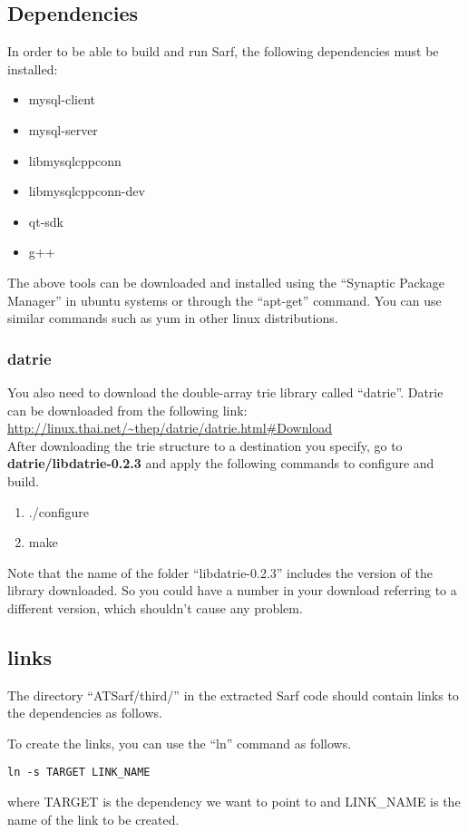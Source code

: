 \documentclass{article}
\begin{document}
\subsection{Dependencies}
In order to be able to build and run Sarf, the following dependencies must be installed:
\begin{itemize}
\item mysql-client
\item mysql-server
\item libmysqlcppconn
\item libmysqlcppconn-dev
\item qt-sdk
\item g++
\end{itemize}
The above tools can be downloaded and installed using the ``Synaptic Package Manager'' in ubuntu systems or through the ``apt-get'' command. You can use similar commands such as yum in other linux distributions.
\subsubsection{datrie}
You also need to download the double-array trie library called ``datrie''. Datrie can be downloaded from the following link:\\
\url{http://linux.thai.net/~thep/datrie/datrie.html#Download }\\
After downloading the trie structure to a destination you specify, go to {\bf datrie/libdatrie-0.2.3} and apply the following commands to configure and build.
\begin{enumerate}
\item ./configure
\item make
\end{enumerate}
Note that the name of the folder ``libdatrie-0.2.3'' includes the version of the library downloaded. So you could have a number in your download referring to a different version, which shouldn't cause any problem.

\subsection{links}
The directory ``ATSarf/third/'' in the extracted Sarf code should contain links to the dependencies as follows.

To create the links, you can use the ``ln'' command as follows.\\
\begin{verbatim}
ln -s TARGET LINK_NAME
\end{verbatim}
where TARGET is the dependency we want to point to and LINK\_NAME is the name of the link to be created.
\end{document}
